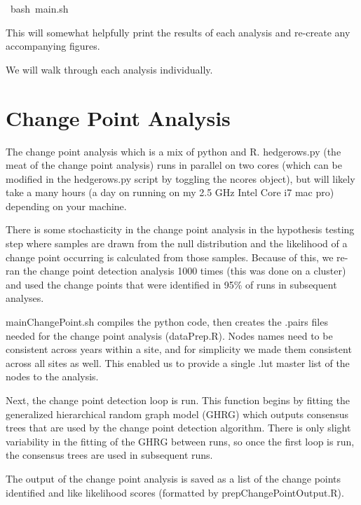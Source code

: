 \documentclass{article}\usepackage[]{graphicx}\usepackage[]{color}
\makeatletter
\newcommand{\hlstd}[1]{\textcolor[rgb]{0.345,0.345,0.345}{#1}}%
\newenvironment{kframe}{%
 \def\at@end@of@kframe{}%
 \ifinner\ifhmode%
  \def\at@end@of@kframe{\end{minipage}}%
  \begin{minipage}{\columnwidth}%
 \fi\fi%
 \def\FrameCommand##1{\hskip\@totalleftmargin \hskip-\fboxsep
 \colorbox{shadecolor}{##1}\hskip-\fboxsep
     \hskip-\linewidth \hskip-\@totalleftmargin \hskip\columnwidth}%
 \MakeFramed {\advance\hsize-\width
   \@totalleftmargin\z@ \linewidth\hsize
   \@setminipage}}%
 {\par\unskip\endMakeFramed%
 \at@end@of@kframe}
\newenvironment{knitrout}{}{} %
\makeatother
\begin{document}
\begin{knitrout}
\color{fgcolor}\begin{kframe}
\noindent
\ttfamily
\hlstd{\ bash\ main.sh}\hspace*{\fill}
\mbox{}
\normalfont
\end{kframe}
\end{knitrout}

This will somewhat helpfully print the results of each analysis
and re-create any accompanying figures.

We will walk through each analysis individually.


\section{Change Point Analysis}

The change point analysis which is a mix of python and R. hedgerows.py
(the meat of the change point analysis) runs in parallel on two cores
(which can be modified in the hedgerows.py script by toggling the
ncores object), but will likely take a many hours (a day on running on
my 2.5 GHz Intel Core i7 mac pro) depending on your machine.

There is some stochasticity in the change point analysis in the
hypothesis testing step where samples are drawn from the null
distribution and the likelihood of a change point occurring is
calculated from those samples. Because of this, we re-ran the change
point detection analysis 1000 times (this was done on a cluster) and
used the change points that were identified in 95\% of runs in
subsequent analyses.

mainChangePoint.sh compiles the python code, then creates the .pairs
files needed for the change point analysis (dataPrep.R). Nodes names
need to be consistent across years within a site, and for simplicity
we made them consistent across all sites as well. This enabled us to
provide a single .lut master list of the nodes to the analysis.

Next, the change point detection loop is run. This function begins by
fitting the generalized hierarchical random graph model (GHRG) which
outputs consensus trees that are used by the change point detection
algorithm. There is only slight variability in the fitting of the
GHRG between runs, so once the first loop is run, the consensus trees
are used in subsequent runs.

The output of the change point analysis is saved as a list of the
change points identified and like likelihood scores (formatted by
prepChangePointOutput.R).
\end{document}

